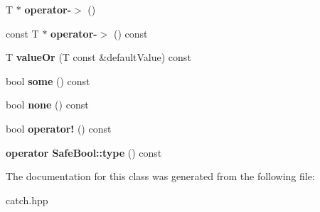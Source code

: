 \begin{DoxyCompactItemize}
T $\ast$ {\bfseries operator-\/$>$} ()
\item 
\mbox{\label{class_catch_1_1_option_ae8343cbc36dbb95b2dce333d2a6fdc28}} 
const T $\ast$ {\bfseries operator-\/$>$} () const
\item 
\mbox{\label{class_catch_1_1_option_a8d9ae2e30b0eb76fe134a6fbc8423124}} 
T {\bfseries value\+Or} (T const \&default\+Value) const
\item 
\mbox{\label{class_catch_1_1_option_a97c95829afbe92f2bcc5fd75b32c0825}} 
bool {\bfseries some} () const
\item 
\mbox{\label{class_catch_1_1_option_a821753afdc3fac947a13a01fbe0d248e}} 
bool {\bfseries none} () const
\item 
\mbox{\label{class_catch_1_1_option_a96dccb86bdf45ee0c08e122b6133bef3}} 
bool {\bfseries operator!} () const
\item 
\mbox{\label{class_catch_1_1_option_a8ed8de7b072f893c85df14913dbbe197}} 
{\bfseries operator Safe\+Bool\+::type} () const
\end{DoxyCompactItemize}


The documentation for this class was generated from the following file\+:\begin{DoxyCompactItemize}
\item 
catch.\+hpp\end{DoxyCompactItemize}
